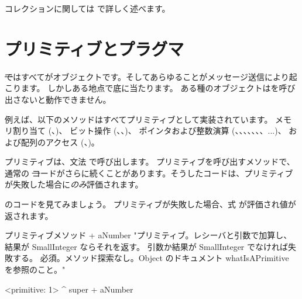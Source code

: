 \documentclass[a4paper,10pt,twoside]{book}
\begin{document}
コレクションに関しては  で詳しく述べます。

\section{プリミティブとプラグマ}

\st ではすべてがオブジェクトです。そしてあらゆることがメッセージ送信により起こります。
しかしある地点で底に当たります。
ある種のオブジェクトはを呼び出さないと動作できません。

例えば、以下のメソッドはすべてプリミティブとして実装されています。
メモリ割り当て (、)、
ビット操作 (、、)、
ポインタおよび整数演算 (\ct{+}、\ct{-}、\ct{<}、\ct{>}、\ct{*}、\ct{/ }、\ct{=}、\ct{==}...)、
および配列のアクセス (、)。

プリミティブは、文法  で呼び出します。
プリミティブを呼び出すメソッドで、通常の \st コードがさらに続くことがあります。そうしたコードは、プリミティブが失敗した場合に\emph{のみ}評価されます。

のコードを見てみましょう。
プリミティブが失敗した場合、式  が評価され値が返されます。

\begin{method}[primitive]{プリミティブメソッド}
+ aNumber 
  "プリミティブ。レシーバと引数で加算し、結果が SmallInteger ならそれを返す。
  引数か結果が SmallInteger でなければ失敗する。
  必須。メソッド探索なし。Object のドキュメント whatIsAPrimitive を参照のこと。"

  <primitive: 1>
  ^ super + aNumber
\end{method}

\end{document}

